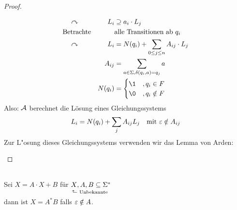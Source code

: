 \begin{proof}
\begin{description}[labelwidth=\widthof{\<=},leftmargin=!]
\begin{alignat*}{2}
			&\quad\curvearrowright & L_i &\supseteq a_i\cdot L_j\\
			&\text{Betrachte} &  & \text{alle Transitionen ab }q_i \\
			&\quad\curvearrowright & L_i &= N(q_i)+\sum_{0 \le j \le n} A_{ij}\cdot L_j\\
			&& A_{ij} &= \sum_{a \in \Sigma, \delta(q_i,a) = q_j} a \\
			&& N(q_i) &= 
				\begin{cases}
					\1 &, q_i\in F\\
					\0 &, q_i\notin F
				\end{cases}
		\end{alignat*}
		Also: $\mathcal{A}$ berechnet die Lösung eines Gleichungssystems
		\[ L_i=N(q_i) + \sum_j A_{ij}L_j \quad\text{mit }\varepsilon\notin A_{ij} \]
		Zur L"osung dieses Gleichungssystems verwenden wir das Lemma von Arden:
	\end{description}
\end{proof}
\begin{lemma}\label{lem:arden}\ \\
	Sei $X=A\cdot X+B$ für $\underset{\vphantom{\big(}\ \mathrlap{\hspace{-4pt}\rotatebox[origin=c]{90}{$\Rsh$}\ \text{Unbekannte}}}{X} ,A,B\subseteq \Sigma^*$\\
	dann ist $X=A^*B$ falls $\varepsilon\notin A$.
\end{lemma}
